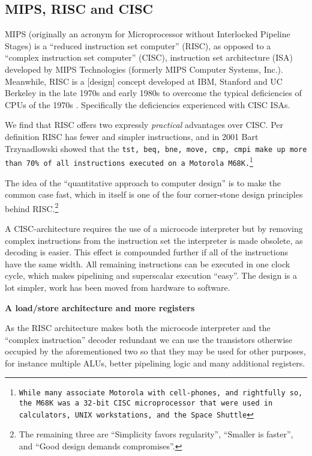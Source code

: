 \subsection{MIPS, RISC and CISC}

MIPS (originally an acronym for Microprocessor without Interlocked
Pipeline Stages) is a ``reduced instruction set computer'' (RISC), as
opposed to a ``complex instruction set computer'' (CISC), instruction
set architecture (ISA) developed by MIPS Technologies (formerly MIPS
Computer Systems, Inc.). Meanwhile, RISC is a [design] concept
developed at IBM, Stanford and UC Berkeley in the late 1970s and early
1980s to overcome the typical deficiencies of CPUs of the 1970s
 \cite{CNS:RISC-Architecture}\cite{Stokes:1999:RISCvsCISC}. Specifically the deficiencies
experienced with CISC ISAs.

We find that RISC offers two expressly \emph{practical} advantages
over CISC. Per definition RISC has fewer and simpler instructions,
and in 2001 Bart Trzynadlowski showed that the \tt{tst}, \tt{beq},
\tt{bne}, \tt{move}, \tt{cmp}, \tt{cmpi} make up more
than 70\% of all instructions executed on a Motorola
M68K.\footnote{While many associate Motorola with cell-phones, and
  rightfully so, the M68K was a 32-bit CISC microprocessor that were
  used in calculators, UNIX workstations, and the Space Shuttle}
\cite{Trzynadlowski:2001:68k} 

The idea of the ``quantitative approach to computer design''
\cite{Patterson:2008:COD:1502247} is to make the common case fast,
which in itself is one of the four corner-stone design principles
behind RISC.\footnote{The remaining three are ``Simplicity favors
  regularity'', ``Smaller is faster'', and ``Good design demands
  compromises''.\cite{Irwin:CSE331W02.11:2007:PSU}}

A CISC-architecture requires the use of a microcode interpreter but by
removing complex instructions from the instruction set the interpreter
is made obsolete, as decoding is easier. This effect is compounded
further if all of the instructions have the same width. All remaining
instructions can be executed in one clock cycle, which makes
pipelining and superscalar execution ``easy''. The design is a lot
simpler, work has been moved from hardware to software.

\textbf{A load/store architecture and more registers}

As the RISC architecture makes both the microcode interpreter and the
``complex instruction'' decoder redundant we can use the transistors
otherwise occupied by the aforementioned two so that they may be used
for other purposes, for instance multiple ALUs, better pipelining
logic and many additional registers.

